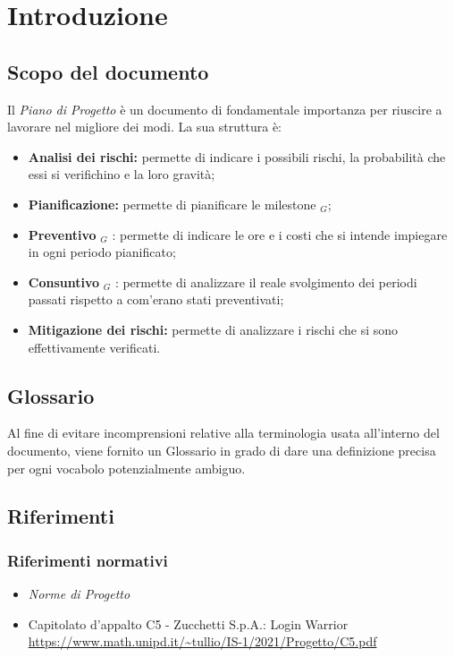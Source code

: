 \chapter{Introduzione}

\section{Scopo del documento}

Il \textit{Piano di Progetto} è un documento di fondamentale importanza per riuscire a lavorare nel migliore dei
modi. La sua struttura è:
\begin{itemize}
    \item \textbf{Analisi dei rischi: } permette di indicare i possibili rischi, la probabilità che essi si verifichino e la loro gravità;
    \item \textbf{Pianificazione: } permette di pianificare le milestone $_G$;
    \item \textbf{Preventivo} $_G$ : permette di indicare le ore e i costi che si intende impiegare in ogni periodo pianificato;
    \item \textbf{Consuntivo} $_G$ : permette di analizzare il reale svolgimento dei periodi passati rispetto a com'erano stati preventivati;
    \item \textbf{Mitigazione dei rischi: } permette di analizzare i rischi che si sono effettivamente verificati. 
\end{itemize}

\section{Glossario}
Al fine di evitare incomprensioni relative alla terminologia usata all'interno del documento, viene fornito un Glossario in grado di dare una definizione precisa per ogni vocabolo potenzialmente ambiguo.

\section{Riferimenti}
\subsection{Riferimenti normativi}
\begin{itemize}
  \item \textit{Norme di Progetto}
  \item Capitolato d'appalto C5 - Zucchetti S.p.A.: Login Warrior \\
  \url{https://www.math.unipd.it/~tullio/IS-1/2021/Progetto/C5.pdf}
\end{itemize}

